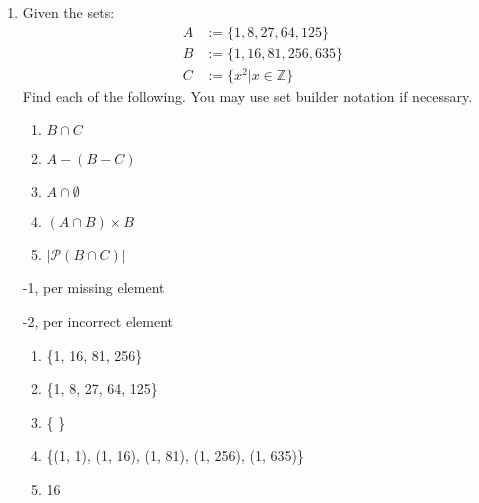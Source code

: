 \begin{enumerate}

















    
\item Given the sets: 
\begin{align*}
    A &:= \{1,8,27,64,125\}\\
    B &:= \{1,16,81,256,635\}\\
    C &:= \{x^2 | x \in \mathbb{Z}\}\
\end{align*}
Find each of the following. You may use set builder notation if necessary.
\pte 5

\begin{enumerate}
    \item $B \cap C$
    \item $A-(B-C)$
    \item $A \cap \emptyset$
    \item $(A \cap B) \times B$
    \item $|\mathcal{P}(B\cap C)|$
\end{enumerate}

\begin{rubric}
-1, per missing element

-2, per incorrect element

\end{rubric}

\begin{solution}
\begin{enumerate}
    \item \{1, 16, 81, 256\}
    \item \{1, 8, 27, 64, 125\}
    \item \{ \}
    \item \{(1, 1), (1, 16), (1, 81), (1, 256), (1, 635)\}
    \item 16
\end{enumerate}
\end{solution}


\end{enumerate}

